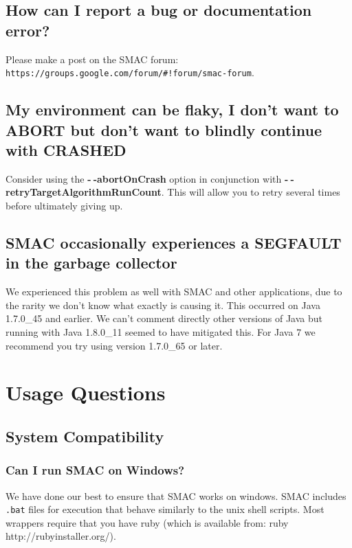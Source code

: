 \documentclass[11pt,letterpaper,oneside]{article}
\begin{document}
\subsection{How can I report a bug or documentation error?}

	Please make a post on the SMAC forum: \texttt{https://groups.google.com/forum/\#!forum/smac-forum}.

\subsection{My environment can be flaky, I don't want to ABORT but don't want to blindly continue with CRASHED}

	Consider using the \textbf{-$~\!$-abortOnCrash} option in conjunction with \textbf{-$~\!$-retryTargetAlgorithmRunCount}. This will allow you to retry several times before ultimately giving up.

\subsection{SMAC occasionally experiences a SEGFAULT in the garbage collector}
	
	We experienced this problem as well with SMAC and other applications, due to the rarity we don't know what exactly is causing it. This occurred on Java 1.7.0\_45 and earlier. We can't comment directly other versions of Java but running with Java 1.8.0\_11 seemed to have mitigated this. For Java 7 we recommend you try using version 1.7.0\_65 or later.
	
	

\section{Usage Questions}

\subsection{System Compatibility}
\subsubsection{Can I run SMAC on Windows?}

	We have done our best to ensure that SMAC works on windows. SMAC includes \texttt{.bat} files for execution that behave similarly to the unix shell scripts. Most wrappers require that you have ruby (which is available from: ruby http://rubyinstaller.org/). 
	
\end{document}
